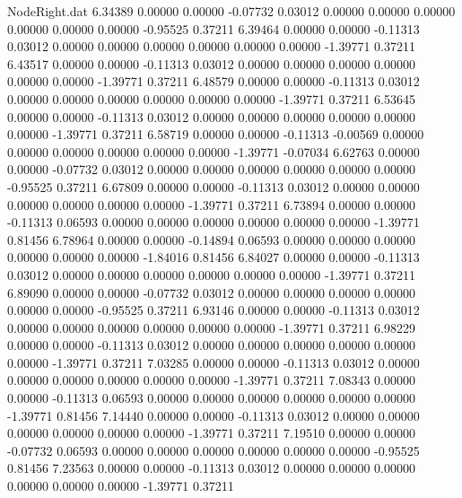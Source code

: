 \begin{filecontents}{NodeRight.dat}
   6.34389    0.00000    0.00000    -0.07732    0.03012    0.00000    0.00000    0.00000    0.00000    0.00000    0.00000   -0.95525    0.37211
   6.39464    0.00000    0.00000    -0.11313    0.03012    0.00000    0.00000    0.00000    0.00000    0.00000    0.00000   -1.39771    0.37211
   6.43517    0.00000    0.00000    -0.11313    0.03012    0.00000    0.00000    0.00000    0.00000    0.00000    0.00000   -1.39771    0.37211
   6.48579    0.00000    0.00000    -0.11313    0.03012    0.00000    0.00000    0.00000    0.00000    0.00000    0.00000   -1.39771    0.37211
   6.53645    0.00000    0.00000    -0.11313    0.03012    0.00000    0.00000    0.00000    0.00000    0.00000    0.00000   -1.39771    0.37211
   6.58719    0.00000    0.00000    -0.11313   -0.00569    0.00000    0.00000    0.00000    0.00000    0.00000    0.00000   -1.39771   -0.07034
   6.62763    0.00000    0.00000    -0.07732    0.03012    0.00000    0.00000    0.00000    0.00000    0.00000    0.00000   -0.95525    0.37211
   6.67809    0.00000    0.00000    -0.11313    0.03012    0.00000    0.00000    0.00000    0.00000    0.00000    0.00000   -1.39771    0.37211
   6.73894    0.00000    0.00000    -0.11313    0.06593    0.00000    0.00000    0.00000    0.00000    0.00000    0.00000   -1.39771    0.81456
   6.78964    0.00000    0.00000    -0.14894    0.06593    0.00000    0.00000    0.00000    0.00000    0.00000    0.00000   -1.84016    0.81456
   6.84027    0.00000    0.00000    -0.11313    0.03012    0.00000    0.00000    0.00000    0.00000    0.00000    0.00000   -1.39771    0.37211
   6.89090    0.00000    0.00000    -0.07732    0.03012    0.00000    0.00000    0.00000    0.00000    0.00000    0.00000   -0.95525    0.37211
   6.93146    0.00000    0.00000    -0.11313    0.03012    0.00000    0.00000    0.00000    0.00000    0.00000    0.00000   -1.39771    0.37211
   6.98229    0.00000    0.00000    -0.11313    0.03012    0.00000    0.00000    0.00000    0.00000    0.00000    0.00000   -1.39771    0.37211
   7.03285    0.00000    0.00000    -0.11313    0.03012    0.00000    0.00000    0.00000    0.00000    0.00000    0.00000   -1.39771    0.37211
   7.08343    0.00000    0.00000    -0.11313    0.06593    0.00000    0.00000    0.00000    0.00000    0.00000    0.00000   -1.39771    0.81456
   7.14440    0.00000    0.00000    -0.11313    0.03012    0.00000    0.00000    0.00000    0.00000    0.00000    0.00000   -1.39771    0.37211
   7.19510    0.00000    0.00000    -0.07732    0.06593    0.00000    0.00000    0.00000    0.00000    0.00000    0.00000   -0.95525    0.81456
   7.23563    0.00000    0.00000    -0.11313    0.03012    0.00000    0.00000    0.00000    0.00000    0.00000    0.00000   -1.39771    0.37211

\end{filecontents}
